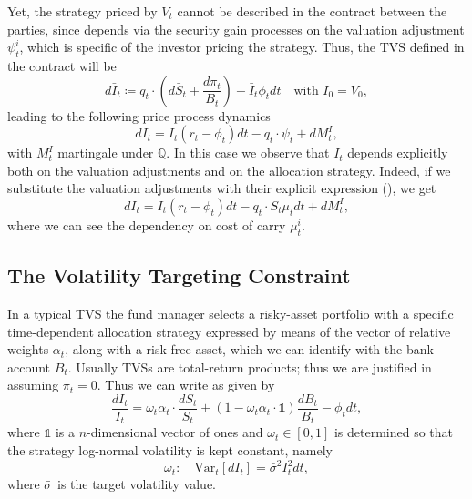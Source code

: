 \documentclass[11pt]{article}
\begin{document}
Yet, the strategy priced by $V_t$ cannot be described in the contract between the parties, since  depends via the security gain processes on the valuation adjustment $\psi_t^i$, which is specific of the investor pricing the strategy. Thus, the TVS defined in the contract will be
\begin{equation}
    d\bar{I}_t \coloneqq q_t \cdot \left(d\bar{S}_t + \frac{d\pi_t}{B_t} \right) - \bar{I}_t\phi_t dt \quad \text{with }I_0 = V_0, 
\label{eq:TVS_first}\end{equation}
leading to the following price process dynamics
\begin{equation}
    dI_t = I_t(r_t-\phi_t)dt -q_t\cdot \psi_t +dM_t^I,
\end{equation}
with $M_t^I$ martingale under $\mathbb{Q}$. In this case we observe that $I_t$ depends explicitly both on the valuation adjustments and on the allocation strategy. Indeed, if we substitute the valuation adjustments with their explicit expression (), we get
\begin{equation}
    dI_t = I_t(r_t-\phi_t)dt - q_t \cdot S_t \mu_t dt + dM_t^I,
\end{equation}
where we can see the dependency on cost of carry $\mu_t^i$.
\subsection{The Volatility Targeting Constraint}
In a typical TVS the fund manager selects a risky-asset portfolio with a specific time-dependent allocation strategy expressed by means of the vector of relative weights $\alpha_t$, along with a risk-free asset, which we can identify with the bank account $B_t$. Usually TVSs are total-return products; thus we are justified in assuming $\pi_t=0$. Thus we can write  as given by
\begin{equation}
    \frac{dI_t}{I_t}= \omega_t \alpha_t \cdot \frac{dS_t}{S_t} + \left(1-\omega_t  \alpha_t \cdot \mathds{1} \right)\frac{dB_t}{B_t}- \phi_t dt,
\label{TVS_elegant}\end{equation}
where $\mathds{1}$ is a $n$-dimensional vector of ones and $\omega_t\in[0,1]$ is determined so that the strategy log-normal volatility is kept constant, namely
\begin{equation}
        \omega_t: \quad \mathrm{Var}_t[dI_t] = \bar{\sigma}^2I_t^2dt,
\end{equation}
where $\Bar{\sigma}$ is the target volatility value.
\end{document}
